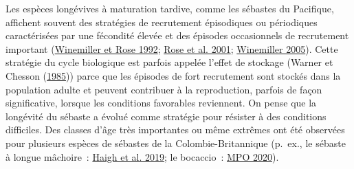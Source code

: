 \documentclass[french,11pt]{book}
\begin{document}
Les espèces longévives à maturation tardive, comme les sébastes du Pacifique, affichent souvent des stratégies de recrutement épisodiques ou périodiques caractérisées par une fécondité élevée et des épisodes occasionnels de recrutement important (\protect\hyperlink{ref-winemiller1992}{Winemiller et Rose 1992}; \protect\hyperlink{ref-rose2001}{Rose et al. 2001}; \protect\hyperlink{ref-winemiller2005}{Winemiller 2005}). Cette stratégie du cycle biologique est parfois appelée l'effet de stockage (Warner et Chesson (\protect\hyperlink{ref-warner1985}{1985})) parce que les épisodes de fort recrutement sont stockés dans la population adulte et peuvent contribuer à la reproduction, parfois de façon significative, lorsque les conditions favorables reviennent. On pense que la longévité du sébaste a évolué comme stratégie pour résister à des conditions difficiles. Des classes d'âge très importantes ou même extrêmes ont été observées pour plusieurs espèces de sébastes de la Colombie-Britannique (p.~ex., le sébaste à longue mâchoire~: \protect\hyperlink{ref-haigh2019}{Haigh et al. 2019}; le bocaccio~: \protect\hyperlink{ref-haigh2020}{MPO 2020}).
\end{document}
